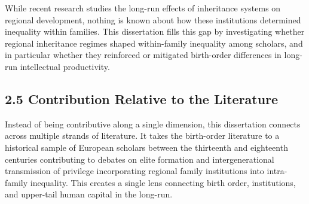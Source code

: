 While recent research studies the long-run effects of inheritance systems on regional development, nothing is known about how these institutions determined inequality within families. This dissertation fills this gap by investigating whether regional inheritance regimes shaped within-family inequality among scholars, and in particular whether they reinforced or mitigated birth-order differences in long-run intellectual productivity.

\subsection*{2.5 Contribution Relative to the Literature}

Instead of being contributive along a single dimension, this dissertation connects across multiple strands of literature. It takes the birth-order literature to a historical sample of European scholars between the thirteenth and eighteenth centuries contributing to debates on elite formation and intergenerational transmission of privilege incorporating regional family institutions into intra-family inequality. This creates a single lens connecting birth order, institutions, and upper-tail human capital in the long-run.